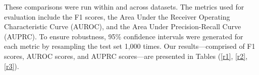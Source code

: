 \documentclass{article}
\theoremstyle{plain}
\theoremstyle{definition}
\theoremstyle{remark}
\begin{document}


    
    
    


These comparisons were run within and across datasets. The metrics used for evaluation include the F1 scores, the Area Under the Receiver Operating Characteristic Curve (AUROC), and the Area Under Precision-Recall Curve (AUPRC). To ensure robustness, 95\% confidence intervals were generated for each metric by resampling the test set 1,000 times. Our results—comprised of F1 scores, AUROC scores, and AUPRC scores—are presented in Tables (\ref{r1}, \ref{r2},  \ref{r3}).

\end{document}
